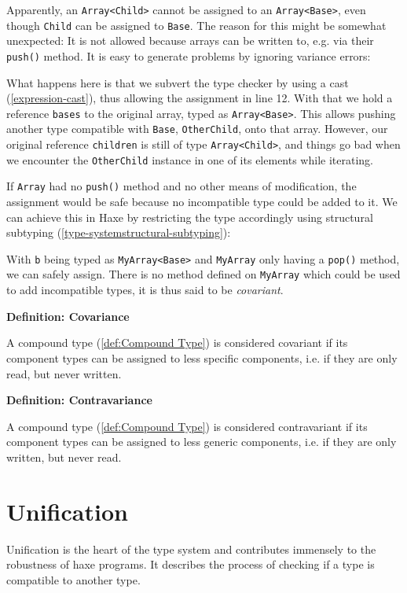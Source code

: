 \documentclass[a4paper,oneside]{book}
\newcommand{\type}[1]{\texttt{#1}}
\newcommand{\expr}[1]{\texttt{#1}}
\newenvironment{myshaded}
  {\def\FrameCommand{\fboxsep=\topsep\colorbox{bgcolor}}%
  \MakeFramed {\advance\hsize-\width \FrameRestore}}%
 {\endMakeFramed}
\newcommand{\define}[3][Definition]
	{\begin{myshaded}\noindent\textbf{#1: #2}\par\nobreak\noindent\ignorespaces#3\label{def:#2}\end{myshaded}}
\newcommand{\tref}[2]{#1 (\ref{#2})}
\newcommand{\haxe}[2][]{%
}
\begin{document}
\haxe{assets/Variance.hx}

Apparently, an \type{Array<Child>} cannot be assigned to an \type{Array<Base>}, even though \type{Child} can be assigned to \type{Base}. The reason for this might be somewhat unexpected: It is not allowed because arrays can be written to, e.g. via their \expr{push()} method. It is easy to generate problems by ignoring variance errors:

\haxe{assets/Variance2.hx}

What happens here is that we subvert the type checker by using a \tref{cast}{expression-cast}, thus allowing the assignment in line 12. With that we hold a reference \expr{bases} to the original array, typed as \type{Array<Base>}. This allows pushing another type compatible with \type{Base}, \type{OtherChild}, onto that array. However, our original reference \expr{children} is still of type \type{Array<Child>}, and things go bad when we encounter the \type{OtherChild} instance in one of its elements while iterating.

If \type{Array} had no \expr{push()} method and no other means of modification, the assignment would be safe because no incompatible type could be added to it. We can achieve this in Haxe by restricting the type accordingly using \tref{structural subtyping}{type-systemstructural-subtyping}:

\haxe{assets/Variance3.hx}

With \expr{b} being typed as \type{MyArray<Base>} and \type{MyArray} only having a \expr{pop()} method, we can safely assign. There is no method defined on \type{MyArray} which could be used to add incompatible types, it is thus said to be \emph{covariant}.

\define{Covariance}{A \tref{compound type}{def:Compound Type} is considered covariant if its component types can be assigned to less specific components, i.e. if they are only read, but never written.}

\define{Contravariance}{A \tref{compound type}{def:Compound Type} is considered contravariant if its component types can be assigned to less generic components, i.e. if they are only written, but never read.}




\section{Unification}
\label{type-systemunification}

Unification is the heart of the type system and contributes immensely to the robustness of haxe programs. It describes the process of checking if a type is compatible to another type.
\end{document}
